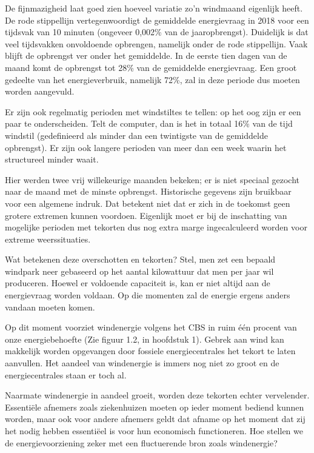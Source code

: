 \documentclass[
  11pt,
  a4paper,
]{book}
\begin{document}
De fijnmazigheid laat goed zien hoeveel variatie zo'n windmaand eigenlijk heeft. De rode stippellijn vertegenwoordigt de gemiddelde energievraag in 2018 voor een tijdsvak van 10 minuten (ongeveer 0,002\% van de jaaropbrengst). Duidelijk is dat veel tijdsvakken onvoldoende opbrengen, namelijk onder de rode stippellijn. Vaak blijft de opbrengst ver onder het gemiddelde. In de eerste tien dagen van de maand komt de opbrengst tot 28\% van de gemiddelde energievraag. Een groot gedeelte van het energieverbruik, namelijk 72\%, zal in deze periode dus moeten worden aangevuld.

Er zijn ook regelmatig perioden met windstiltes te tellen: op het oog zijn er een paar te onderscheiden. Telt de computer, dan is het in totaal 16\% van de tijd windstil (gedefinieerd als minder dan een twintigste van de gemiddelde opbrengst). Er zijn ook langere perioden van meer dan een week waarin het structureel minder waait.

Hier werden twee vrij willekeurige maanden bekeken; er is niet speciaal gezocht naar de maand met de minste opbrengst. Historische gegevens zijn bruikbaar voor een algemene indruk. Dat betekent niet dat er zich in de toekomst geen grotere extremen kunnen voordoen. Eigenlijk moet er bij de inschatting van mogelijke perioden met tekorten dus nog extra marge ingecalculeerd worden voor extreme weerssituaties.

\bigskip\noindent Wat betekenen deze overschotten en tekorten? Stel, men zet een bepaald windpark neer gebaseerd op het aantal kilowattuur dat men per jaar wil produceren. Hoewel er voldoende capaciteit is, kan er niet altijd aan de energievraag worden voldaan. Op die momenten zal de energie ergens anders vandaan moeten komen.

Op dit moment voorziet windenergie volgens het CBS in ruim één procent van onze energiebehoefte (Zie figuur 1.2, in hoofdstuk 1). Gebrek aan wind kan makkelijk worden opgevangen door fossiele energiecentrales het tekort te laten aanvullen. Het aandeel van windenergie is immers nog niet zo groot en de energiecentrales staan er toch al.

Naarmate windenergie in aandeel groeit, worden deze tekorten echter vervelender. Essentiële afnemers zoals ziekenhuizen moeten op ieder moment bediend kunnen worden, maar ook voor andere afnemers geldt dat afname op het moment dat zij het nodig hebben essentiëel is voor hun economisch functioneren. Hoe stellen we de energievoorziening zeker met een fluctuerende bron zoals windenergie?
\end{document}
